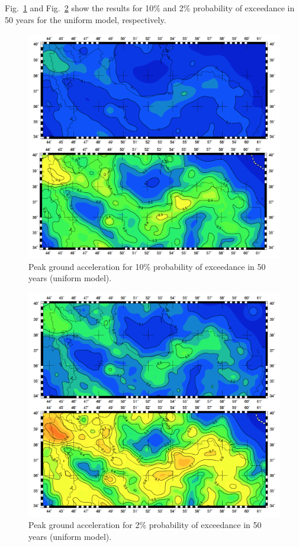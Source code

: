 Fig.~\ref{fig:pga_10_mean_uniform} and Fig.~\ref{fig:pga_2_mean_uniform} show the results for 10\% and 2\% probability of exceedance in 50 years for the uniform model, respectively.

\begin{figure} [!ht]
\centering
\includegraphics[scale=0.3]{figures/pdf/pga_10_mean_uniform.pdf} 
\caption{Peak ground acceleration for 10\% probability of exceedance in 50 years (uniform model).}
\label{fig:pga_10_mean_uniform}
\end{figure}

\begin{figure} [!ht]
\centering
\includegraphics[scale=0.3]{figures/pdf/pga_2_mean_uniform.pdf} 
\caption{Peak ground acceleration for 2\% probability of exceedance in 50 years (uniform model).}
\label{fig:pga_2_mean_uniform}
\end{figure}
